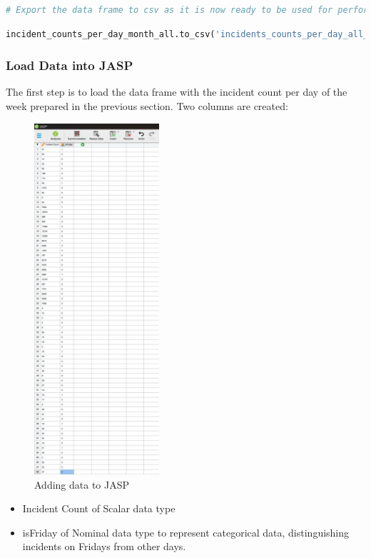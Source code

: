 \documentclass{article}
\begin{document}
\begin{lstlisting}[language=Python, breaklines=true]
# Export the data frame to csv as it is now ready to be used for performing statistical tests.
\end{lstlisting}


\begin{lstlisting}[language=Python, breaklines=true]
incident_counts_per_day_month_all.to_csv('incidents_counts_per_day_all_months.csv', encoding='utf-8', index=False)
\end{lstlisting}

\subsubsection{Load Data into JASP}

The first step is to load the data frame with the incident count per day of the week prepared in the previous section. Two columns are created:

\begin{figure}[H]
    \centering
    \includegraphics[width=0.5\linewidth, height=13cm]{resources/Screenshot 2024-09-25 011255.png}
    \caption{Adding data to JASP}
    \label{fig:enter-label}
\end{figure}

\begin{itemize}
    \item Incident Count of Scalar data type
    \item isFriday of Nominal data type to represent categorical data, distinguishing incidents on Fridays from other days.
\end{itemize}
\end{document}
